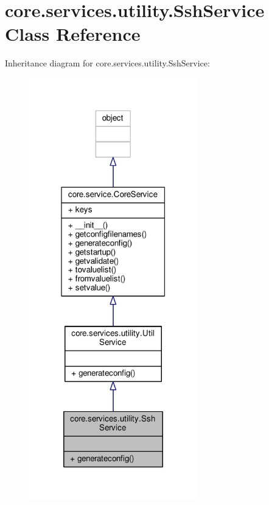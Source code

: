 \hypertarget{classcore_1_1services_1_1utility_1_1_ssh_service}{\section{core.\+services.\+utility.\+Ssh\+Service Class Reference}
\label{classcore_1_1services_1_1utility_1_1_ssh_service}
}


Inheritance diagram for core.\+services.\+utility.\+Ssh\+Service\+:
\nopagebreak
\begin{figure}[H]
\begin{center}
\leavevmode
\includegraphics[width=207pt]{classcore_1_1services_1_1utility_1_1_ssh_service__inherit__graph}
\end{center}
\end{figure}


